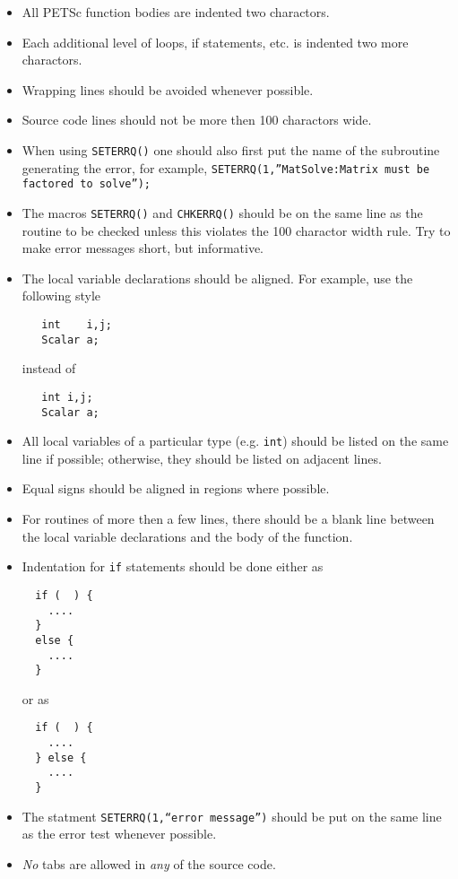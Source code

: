 \begin{itemize}
\item All PETSc function bodies are indented two charactors.
\item Each additional level of loops, if statements, etc. is indented
      two more charactors.
\item Wrapping lines should be avoided whenever possible.
\item Source code lines should not be more then 100 charactors wide.
\item When using {\tt SETERRQ()} one should also first put the name of 
      the subroutine generating the error, for example,
      {\tt SETERRQ(1,''MatSolve:Matrix must be factored to solve'');}
\item The macros {\tt SETERRQ()} and {\tt CHKERRQ()} should be on the 
      same line as the routine to be checked unless this violates the 
      100 charactor width rule. Try to make error messages short, but 
      informative.
\item The local variable declarations should be aligned. For example,
      use the following style
\begin{verbatim}
   int    i,j;
   Scalar a;
\end{verbatim}
instead of
\begin{verbatim}
   int i,j;
   Scalar a;
\end{verbatim}
\item All local variables of a particular type (e.g. {\tt int}) should be 
      listed on the same line if possible; otherwise, they should be listed
      on adjacent lines.
\item Equal signs should be aligned in regions where possible.
\item For routines of more then a few lines, there should be a blank line
      between the local variable declarations and the body of the function.
\item Indentation for {\tt if} statements should be done either as
\begin{verbatim}
  if (  ) {
    ....
  }
  else {
    ....
  }
\end{verbatim}
or as
\begin{verbatim}
  if (  ) {
    ....
  } else {
    ....
  }
\end{verbatim}
\item The statment {\tt SETERRQ(1,``error message'')} should be put on the
      same line as the error test whenever possible.
\item {\em No} tabs are allowed in {\em any} of the source code.
\end{itemize}

